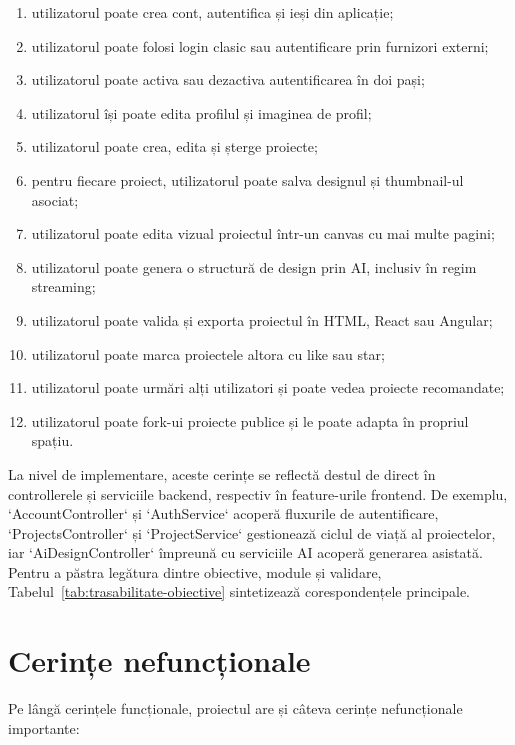 \begin{enumerate}[leftmargin=1.5cm]
  \item utilizatorul poate crea cont, autentifica și ieși din aplicație;
  \item utilizatorul poate folosi login clasic sau autentificare prin furnizori externi;
  \item utilizatorul poate activa sau dezactiva autentificarea în doi pași;
  \item utilizatorul își poate edita profilul și imaginea de profil;
  \item utilizatorul poate crea, edita și șterge proiecte;
  \item pentru fiecare proiect, utilizatorul poate salva designul și thumbnail-ul asociat;
  \item utilizatorul poate edita vizual proiectul într-un canvas cu mai multe pagini;
  \item utilizatorul poate genera o structură de design prin AI, inclusiv în regim streaming;
  \item utilizatorul poate valida și exporta proiectul în HTML, React sau Angular;
  \item utilizatorul poate marca proiectele altora cu like sau star;
  \item utilizatorul poate urmări alți utilizatori și poate vedea proiecte recomandate;
  \item utilizatorul poate fork-ui proiecte publice și le poate adapta în propriul spațiu.
\end{enumerate}

La nivel de implementare, aceste cerințe se reflectă destul de direct în controllerele și serviciile backend, respectiv în feature-urile frontend. De exemplu, `AccountController` și `AuthService` acoperă fluxurile de autentificare, `ProjectsController` și `ProjectService` gestionează ciclul de viață al proiectelor, iar `AiDesignController` împreună cu serviciile AI acoperă generarea asistată. Pentru a păstra legătura dintre obiective, module și validare, Tabelul~\ref{tab:trasabilitate-obiective} sintetizează corespondențele principale.

\section{Cerințe nefuncționale}

Pe lângă cerințele funcționale, proiectul are și câteva cerințe nefuncționale importante:

